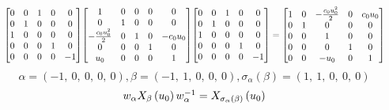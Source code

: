 \documentclass[11pt]{article}
\theoremstyle{definition}
\begin{document}
\[
\scaletoalign{\textwidth}{{\left[\begin{matrix}0 & 0 & 1 & 0 & 0\\0 & 1 & 0 & 0 & 0\\1 & 0 & 0 & 0 & 0\\0 & 0 & 0 & 1 & 0\\0 & 0 & 0 & 0 & -1\end{matrix}\right]} {\left[\begin{matrix}1 & 0 & 0 & 0 & 0\\0 & 1 & 0 & 0 & 0\\- \frac{c_{0} u_{0}^{2}}{2} & 0 & 1 & 0 & - c_{0} u_{0}\\0 & 0 & 0 & 1 & 0\\u_{0} & 0 & 0 & 0 & 1\end{matrix}\right]} {\left[\begin{matrix}0 & 0 & 1 & 0 & 0\\0 & 1 & 0 & 0 & 0\\1 & 0 & 0 & 0 & 0\\0 & 0 & 0 & 1 & 0\\0 & 0 & 0 & 0 & -1\end{matrix}\right]} = {\left[\begin{matrix}1 & 0 & - \frac{c_{0} u_{0}^{2}}{2} & 0 & c_{0} u_{0}\\0 & 1 & 0 & 0 & 0\\0 & 0 & 1 & 0 & 0\\0 & 0 & 0 & 1 & 0\\0 & 0 & - u_{0} & 0 & 1\end{matrix}\right]}}
\]
\[
\alpha = \left( -1, \  0, \  0, \  0, \  0\right), \beta = \left( -1, \  1, \  0, \  0, \  0\right), \sigma_{\alpha}(\beta) = \left( 1, \  1, \  0, \  0, \  0\right)
\]
\[
\scaletoalign{\textwidth}{w_{\alpha} X_{\beta}\left(u_{0}\right) w_{\alpha}^{-1} = X_{\sigma_{\alpha}\left(\beta\right)}\left(u_{0}\right)}
\]
\end{document}
